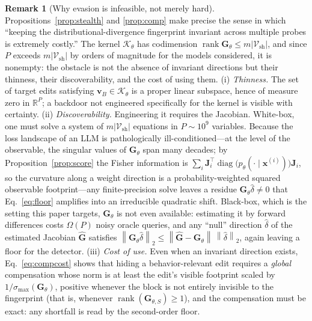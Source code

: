 \documentclass[11pt]{article}
\newcommand{\R}{\mathbb{R}}
\newcommand{\Vsh}{\mathcal{V}_{\mathrm{sh}}}
\newcommand{\norm}[1]{\left\lVert #1 \right\rVert}
\theoremstyle{definition}
\newtheorem{remark}{Remark}
\begin{document}
\begin{remark}[Why evasion is infeasible, not merely hard]
\label{rem:adv}
Propositions~\ref{prop:stealth} and \ref{prop:comp} make precise the sense in
which ``keeping the distributional-divergence fingerprint invariant across
multiple probes is extremely costly.'' The kernel $\mathcal{K}_\theta$ has codimension
$\operatorname{rank}\bm{G}_\theta \le m|\Vsh|$, and since $P$ exceeds
$m|\Vsh|$ by orders of magnitude for the models considered, it is nonempty: the
obstacle is not the absence of invariant directions but their thinness, their
discoverability, and the cost of using them. (i) \emph{Thinness.} The set of
target edits satisfying $\bm{v}_B \in \mathcal{K}_\theta$ is a proper linear
subspace, hence of measure zero in $\R^P$; a backdoor not engineered
specifically for the kernel is visible with certainty. (ii)
\emph{Discoverability.} Engineering it requires the Jacobian. White-box, one
must solve a system of $m|\Vsh|$ equations in $P \sim 10^9$ variables. Because
the loss landscape of an LLM is pathologically ill-conditioned---at the level
of the observable, the singular values of $\bm{G}_\theta$ span many decades; by
Proposition~\ref{prop:score} the Fisher information is $\sum_i \bm{J}_i^\top
\operatorname{diag}\!\big(p_\theta(\cdot\mid \bm{x}^{(i)})\big)\bm{J}_i$, so
the curvature along a weight direction is a probability-weighted squared
observable footprint---any finite-precision solve leaves a residue
$\bm{G}_\theta\hat\delta \ne 0$ that Eq.~\eqref{eq:floor} amplifies into an
irreducible quadratic shift. Black-box, which is the setting this paper
targets, $\bm{G}_\theta$ is not even available: estimating it by forward
differences costs $\Omega(P)$ noisy oracle queries, and any ``null'' direction
$\hat\delta$ of the estimated Jacobian $\hat{\bm{G}}$ satisfies
$\norm{\bm{G}_\theta\hat\delta}_2 \le \norm{\hat{\bm{G}} - \bm{G}_\theta}
\,\norm{\hat\delta}_2$, again leaving a floor for the detector. (iii)
\emph{Cost of use.} Even when an invariant direction exists,
Eq.~\eqref{eq:compcost} shows that hiding a behavior-relevant edit requires a
\emph{global} compensation whose norm is at least the edit's visible footprint
scaled by $1/\sigma_{\max}(\bm{G}_\theta)$, positive whenever the block is not
entirely invisible to the fingerprint (that is, whenever
$\operatorname{rank}(\bm{G}_{\theta,S}) \ge 1$), and the compensation must be
exact: any shortfall is read by the second-order floor.
\end{remark}
\end{document}
